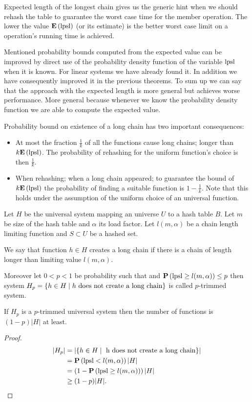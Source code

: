 Expected length of the longest chain gives us the generic hint when we should rehash the table to guarantee the worst case time for the member operation. The lower the value $\mathbf{E}\left(\mathrm{lpsl}\right)$ (or its estimate) is the better worst case limit on a operation's running time is achieved.

Mentioned probability bounds computed from the expected value can be improved by direct use of the probability density function of the variable $\mathrm{lpsl}$ when it is known. For linear systems we have already found it. In addition we have consequently improved it in the previous theorems. To sum up we can say that the approach with the expected length is more general but achieves worse performance. More general because whenever we know the probability density function we are able to compute the expected value.

Probability bound on existence of a long chain has two important consequences:
\begin{itemize}
\item At most the fraction $\frac{1}{k}$ of all the functions cause long chains; longer than $k \mathbf{E}\left(\mathrm{lpsl}\right)$. The probability of rehashing for the uniform function's choice is then $\frac{1}{k}$.
\item When rehashing; when a long chain appeared; to guarantee the bound of $k \mathbf{E}\left(\mathrm{lpsl}\right)$ the probability of finding a suitable function is $1 - \frac{1}{k}$. Note that this holds under the assumption of the uniform choice of an universal function.
\end{itemize}

\begin{definition}
Let $H$ be the universal system mapping an universe $U$ to a hash table $B$. Let $m$ be size of the hash table and $\alpha$ its load factor. Let $l(m, \alpha)$ be a chain length limiting function and $S \subset U$ be a hashed set. 

We say that function $h \in H$ creates a long chain if there is a chain of length longer than limiting value $l(m, \alpha)$.

Moreover let $0 < p < 1$ be probability such that and $\mathbf{P}\left(\mathrm{lpsl} \geq l(m, \alpha)\right) \leq p$ then system $H_p = \{ h \in H \mid h \text{ does not create a long chain} \}$ is called $p$-trimmed system.
\end{definition}

\begin{lemma}
\label{lemma-size-of-trimmed-system}
If $H_p$ is a $p$-trimmed universal system then the number of functions is $(1 - p)|H|$ at least.
\end{lemma}
\begin{proof}
\[
\begin{split}
|H_p|
	& = |\lbrace h \in H \mid \text{ h does not create a long chain} \rbrace| \\
	& =\mathbf{P}\left(\mathrm{lpsl} < l(m, \alpha)\right) |H| \\
	& = \left(1 - \mathbf{P}\left(\mathrm{lpsl} \geq l(m, \alpha)\right)\right) |H| \\
	& \geq (1 - p)|H| \text{.}
\end{split}
\]
\end{proof}

